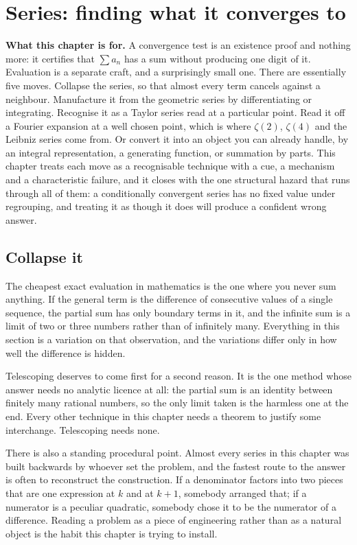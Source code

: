 \chapter{Series: finding what it converges to}

\begin{orient}
\textbf{What this chapter is for.} A convergence test is an existence proof and nothing more: it certifies that $\sum a_n$ has a sum without producing one digit of it. Evaluation is a separate craft, and a surprisingly small one. There are essentially five moves. Collapse the series, so that almost every term cancels against a neighbour. Manufacture it from the geometric series by differentiating or integrating. Recognise it as a Taylor series read at a particular point. Read it off a Fourier expansion at a well chosen point, which is where $\zeta(2)$, $\zeta(4)$ and the Leibniz series come from. Or convert it into an object you can already handle, by an integral representation, a generating function, or summation by parts. This chapter treats each move as a recognisable technique with a cue, a mechanism and a characteristic failure, and it closes with the one structural hazard that runs through all of them: a conditionally convergent series has no fixed value under regrouping, and treating it as though it does will produce a confident wrong answer.
\end{orient}

\section{Collapse it}

The cheapest exact evaluation in mathematics is the one where you never sum anything. If the general term is the difference of consecutive values of a single sequence, the partial sum has only boundary terms in it, and the infinite sum is a limit of two or three numbers rather than of infinitely many. Everything in this section is a variation on that observation, and the variations differ only in how well the difference is hidden.

Telescoping deserves to come first for a second reason. It is the one method whose answer needs no analytic licence at all: the partial sum is an identity between finitely many rational numbers, so the only limit taken is the harmless one at the end. Every other technique in this chapter needs a theorem to justify some interchange. Telescoping needs none.

There is also a standing procedural point. Almost every series in this chapter was built backwards by whoever set the problem, and the fastest route to the answer is often to reconstruct the construction. If a denominator factors into two pieces that are one expression at $k$ and at $k+1$, somebody arranged that; if a numerator is a peculiar quadratic, somebody chose it to be the numerator of a difference. Reading a problem as a piece of engineering rather than as a natural object is the habit this chapter is trying to install.

